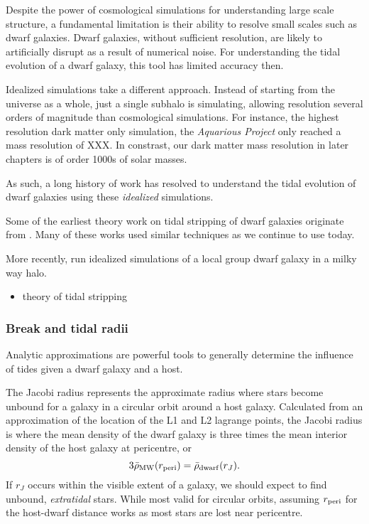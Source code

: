 Despite the power of cosmological simulations for understanding large
scale structure, a fundamental limitation is their ability to resolve
small scales such as dwarf galaxies. Dwarf galaxies, without sufficient
resolution, are likely to artificially disrupt as a result of numerical
noise. For understanding the tidal evolution of a dwarf galaxy, this
tool has limited accuracy then.

Idealized simulations take a different approach. Instead of starting
from the universe as a whole, just a single subhalo is simulating,
allowing resolution several orders of magnitude than cosmological
simulations. For instance, the highest resolution dark matter only
simulation, the \emph{Aquarious Project} only reached a mass resolution
of XXX. In constrast, our dark matter mass resolution in later chapters
is of order 1000s of solar masses.

As such, a long history of work has resolved to understand the tidal
evolution of dwarf galaxies using these \emph{idealized} simulations.

Some of the earliest theory work on tidal stripping of dwarf galaxies
originate from \citep[\citet{moore+davis1994},
\citet{johnston+spergel+hernquist1995}, \citet{oh+lin+aarseth1995},
\citet{piatek+pryor1995}, \citet{velazquez+white1995},
\citet{kroupa1997}]{allen+richstone1988}. Many of these works used
similar techniques as we continue to use today.

More recently, \citet{PNM2008} run idealized simulations of a local
group dwarf galaxy in a milky way halo.

\begin{itemize}
\tightlist
\item
  \citet{mayer+2001} theory of tidal stripping
\end{itemize}

\subsubsection{Break and tidal radii}\label{break-and-tidal-radii}

Analytic approximations are powerful tools to generally determine the
influence of tides given a dwarf galaxy and a host.

The Jacobi radius represents the approximate radius where stars become
unbound for a galaxy in a circular orbit around a host galaxy.
Calculated from an approximation of the location of the L1 and L2
lagrange points, the Jacobi radius is where the mean density of the
dwarf galaxy is three times the mean interior density of the host galaxy
at pericentre, or \begin{equation}{
3\bar \rho_{\rm MW}(r_{\rm peri}) = \bar \rho_{\rm dwarf}(r_J).
}\end{equation} If \(r_J\) occurs within the visible extent of a galaxy,
we should expect to find unbound, \emph{extratidal} stars. While most
valid for circular orbits, assuming \(r_{\rm peri}\) for the host-dwarf
distance works as most stars are lost near pericentre.

